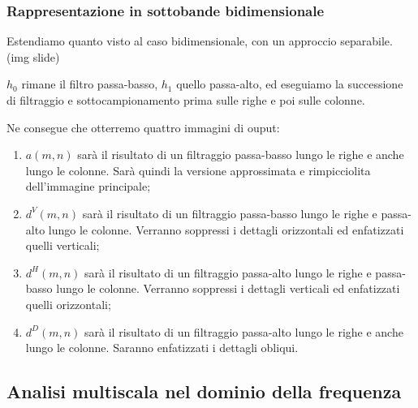 \documentclass[a4paper,11pt]{article}
\begin{document}
\subsubsection{Rappresentazione in sottobande bidimensionale}
Estendiamo quanto visto al caso bidimensionale, con un approccio separabile. (img slide)
\par
$h_0$ rimane il filtro passa-basso, $h_1$ quello passa-alto, ed eseguiamo la successione di filtraggio e sottocampionamento prima sulle righe e poi sulle colonne.
\par
Ne consegue che otterremo quattro immagini di ouput:
\begin{enumerate}
    \item $a(m,n)$ sarà il risultato di un filtraggio passa-basso lungo le righe e anche lungo le colonne. Sarà quindi la versione approssimata e rimpicciolita dell'immagine principale;
    \item $d^V(m,n)$ sarà il risultato di un filtraggio passa-basso lungo le righe e passa-alto lungo le colonne. Verranno soppressi i dettagli orizzontali ed enfatizzati quelli verticali;
    \item $d^H(m,n)$ sarà il risultato di un filtraggio passa-alto lungo le righe e passa-basso lungo le colonne. Verranno soppressi i dettagli verticali ed enfatizzati quelli orizzontali;
    \item $d^D(m,n)$ sarà il risultato di un filtraggio passa-alto lungo le righe e anche lungo le colonne. Saranno enfatizzati i dettagli obliqui.
\end{enumerate}

\subsection{Analisi multiscala nel dominio della frequenza}
\end{document}
